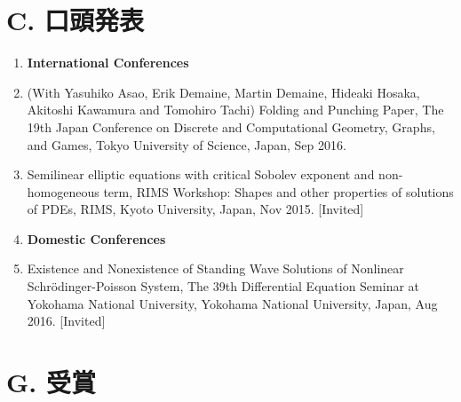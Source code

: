 \section{C. 口頭発表}

\begin{enumerate}
  \item[] {\bf International Conferences}
  \item (With Yasuhiko Asao, Erik Demaine, Martin Demaine, Hideaki Hosaka, Akitoshi Kawamura and Tomohiro Tachi) Folding and Punching Paper, The 19th Japan Conference on Discrete and Computational Geometry, Graphs, and Games, Tokyo University of Science, Japan, Sep 2016.
  \item Semilinear elliptic equations with critical Sobolev exponent and non-homogeneous term, RIMS Workshop: Shapes and other properties of solutions of PDEs, RIMS, Kyoto University, Japan, Nov 2015. [Invited]
  \item[] {\bf Domestic Conferences}
  \item Existence and Nonexistence of Standing Wave Solutions of Nonlinear Schr\"{o}dinger-Poisson System, The 39th Differential Equation Seminar at Yokohama National University, Yokohama National University, Japan, Aug 2016. [Invited]
\end{enumerate}

\section{G. 受賞}

